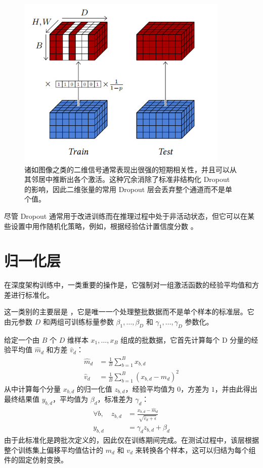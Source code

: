 \begin{figure}
    \centering
    \includegraphics[width=0.9\textwidth]{fig/fig4.8.png}
    \caption[二维 Dropout]{诸如图像之类的二维信号通常表现出很强的短期相关性，并且可以从其邻居中推断出各个激活。这种冗余消除了标准非结构化 Dropout 的影响，因此二维张量的常用 Dropout 层会丢弃整个通道而不是单个值。}
    \label{fig4.8}
\end{figure}

尽管 Dropout 通常用于改进训练而在推理过程中处于非活动状态，但它可以在某些设置中用作随机化策略，例如，根据经验估计置信度分数 \citep{arxiv-1506.02142}。

\section{归一化层}\label{sec4.6}

在深度架构训练中，一类重要的操作是，它强制对一组激活函数的经验平均值和方差进行标准化。

这一类别的主要层是 \citep{43442}，它是唯一一个处理整批数据而不是单个样本的标准层。它由元参数 $D$ 和两组可训练标量参数 $\beta_1,\dots,\beta_D$ 和 $\gamma_1,\dots,\gamma_D$ 参数化。

给定一个由 $B$ 个 $D$ 维样本 $x_1,\dots,x_B$ 组成的批数据，它首先计算每个 D 分量的经验平均值 $\hat{m}_d$ 和方差 $\hat{v}_d$：
\begin{align*}
    \hat{m}_d &= \frac{1}{B}\sum_{b=1}^{B}x_{b,d} \\
    \hat{v}_d &= \frac{1}{B}\sum_{b=1}^{B}(x_{b,d}-\hat{m}_d)^2
\end{align*}
从中计算每个分量 $x_{b,d}$ 的归一化值 $z_{b,d}$，经验平均值为 $0$，方差为 $1$，并由此得出最终结果值 $y_{b,d}$，平均值为 $\beta_d$，标准差为 $\gamma_d$：
\begin{align*}
    \forall b, \quad z_{b,d} &= \frac{x_{b,d}-\hat{m}_d}{\sqrt{\hat{v}_d+\epsilon}}\\
    y_{b,d} &= \gamma_dz_{b,d}+\beta_d
\end{align*}
由于此标准化是跨批次定义的，因此仅在训练期间完成。在测试过程中，该层根据整个训练集上偏移平均值估计的 $m_d$ 和 $v_d$ 来转换各个样本，这可以归结为每个组件的固定仿射变换。

